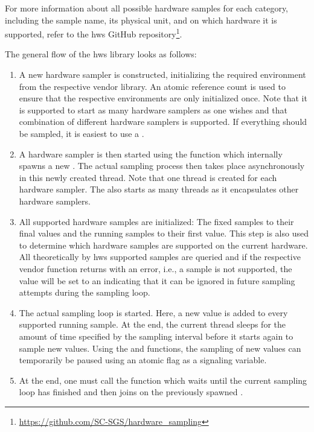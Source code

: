 For more information about all possible hardware samples for each category, including the sample name, its physical unit, and on which hardware it is supported, refer to the hws GitHub repository\footnote{\url{https://github.com/SC-SGS/hardware_sampling}}.

The general flow of the hws library looks as follows:
\begin{enumerate}
    \item%
    A new hardware sampler is constructed, initializing the required environment from the respective vendor library. 
    An atomic reference count is used to ensure that the respective environments are only initialized once. 
    Note that it is supported to start as many hardware samplers as one wishes and that combination of different hardware samplers is supported. 
    If everything should be sampled, it is easiest to use a .
    \item%
    A hardware sampler is then started using the  function which internally spawns a new . 
    The actual sampling process then takes place asynchronously in this newly created thread. 
    Note that one thread is created for each hardware sampler. 
    The  also starts as many threads as it encapsulates other hardware samplers. 
    \item%
    All supported hardware samples are initialized: The fixed samples to their final values and the running samples to their first value. 
    This step is also used to determine which hardware samples are supported on the current hardware. 
    All theoretically by hws supported samples are queried and if the respective vendor function returns with an error, i.e., a sample is not supported, the value will be set to an  indicating that it can be ignored in future sampling attempts during the sampling loop. 
    \item%
    The actual sampling loop is started. 
    Here, a new value is added to every supported running sample. 
    At the end, the current thread sleeps for the amount of time specified by the sampling interval before it starts again to sample new values. 
    Using the  and  functions, the sampling of new values can temporarily be paused using an atomic flag as a signaling variable. 
    \item%
    At the end, one must call the  function which waits until the current sampling loop has finished and then joins on the previously spawned . 

\end{enumerate}
